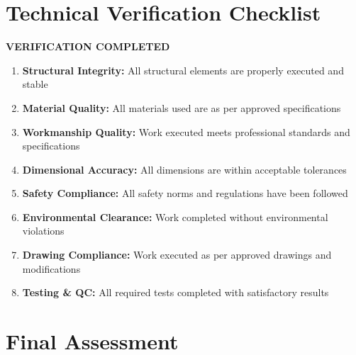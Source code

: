 \documentclass[12pt,a4paper]{article}
\newcommand{\checkbox}{\makebox[1em]{$\boxtimes$}}
\begin{document}
\begin{center}
{\begin{minipage}{0.95\textwidth}
\vspace{1cm}
\section*{Technical Verification Checklist}

\begin{center}
\colorbox{approvedgreen!20}{\begin{minipage}{0.9\textwidth}
\textbf{\textcolor{approvedgreen}{VERIFICATION COMPLETED}}

\vspace{0.5cm}
\begin{enumerate}[leftmargin=1cm]
\item \checkbox \textbf{Structural Integrity:} All structural elements are properly executed and stable

\item \checkbox \textbf{Material Quality:} All materials used are as per approved specifications

\item \checkbox \textbf{Workmanship Quality:} Work executed meets professional standards and specifications

\item \checkbox \textbf{Dimensional Accuracy:} All dimensions are within acceptable tolerances

\item \checkbox \textbf{Safety Compliance:} All safety norms and regulations have been followed

\item \checkbox \textbf{Environmental Clearance:} Work completed without environmental violations

\item \checkbox \textbf{Drawing Compliance:} Work executed as per approved drawings and modifications

\item \checkbox \textbf{Testing \& QC:} All required tests completed with satisfactory results
\end{enumerate}
\end{minipage}}
\end{center}

\vspace{1cm}
\section*{Final Assessment}


\end{minipage}}
\end{center}
\end{document}
